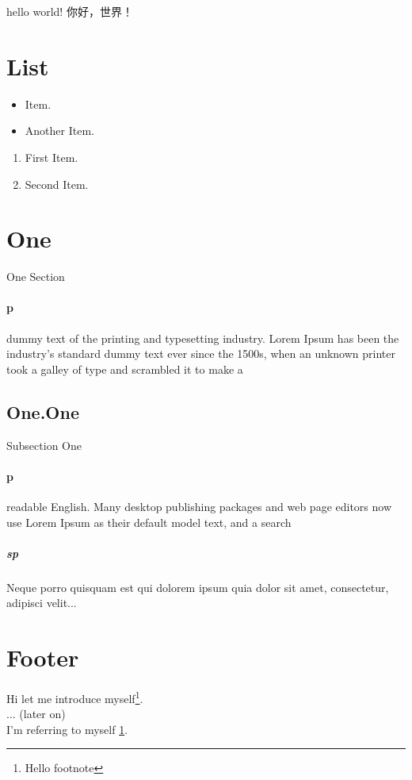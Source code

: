 \documentclass[a4paper]{article}
\begin{document}
\tableofcontents
\newpage

\begin{CJK}{UTF8}{min}
hello world! 你好，世界！
\end{CJK} 

\section{List}

\begin{itemize}
\item Item.
\item Another Item.
\end{itemize}

\begin{enumerate}
\item First Item.
\item Second Item.
\end{enumerate}

\section{One}
One Section

\paragraph{p}
dummy text of the printing and typesetting industry. Lorem Ipsum has been the industry's standard dummy text ever since the 1500s, when an unknown printer took a galley of type and scrambled it to make a 

\subsection{One.One}
Subsection One

\paragraph{p}
readable English. Many desktop publishing packages and web page editors now use Lorem Ipsum as their default model text, and a search

\subparagraph{sp}
Neque porro quisquam est qui dolorem ipsum quia dolor sit amet, consectetur, adipisci velit...

\section{Footer}

Hi let me introduce myself\footnote{\label{myfootnote}Hello footnote}.\\
... (later on)\\
I'm referring to myself \ref{myfootnote}.
\end{document}
